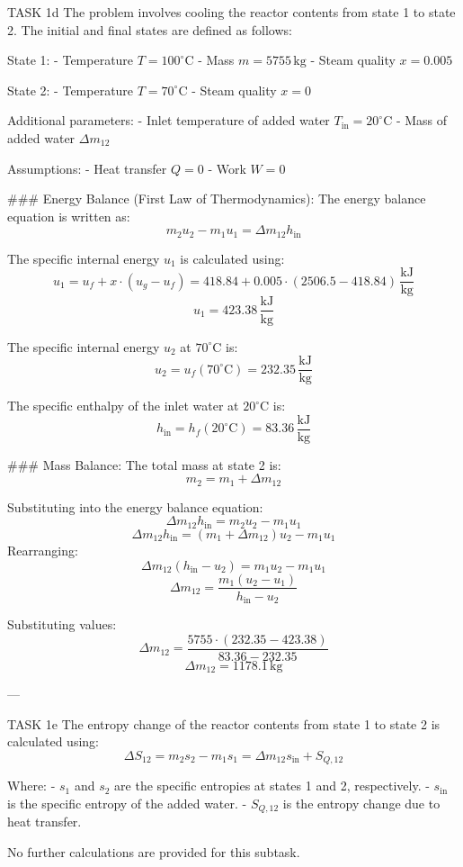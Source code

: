 TASK 1d  
The problem involves cooling the reactor contents from state 1 to state 2. The initial and final states are defined as follows:  

State 1:  
- Temperature \( T = 100^\circ\text{C} \)  
- Mass \( m = 5755 \, \text{kg} \)  
- Steam quality \( x = 0.005 \)  

State 2:  
- Temperature \( T = 70^\circ\text{C} \)  
- Steam quality \( x = 0 \)  

Additional parameters:  
- Inlet temperature of added water \( T_{\text{in}} = 20^\circ\text{C} \)  
- Mass of added water \( \Delta m_{12} \)  

Assumptions:  
- Heat transfer \( Q = 0 \)  
- Work \( W = 0 \)  

### Energy Balance (First Law of Thermodynamics):  
The energy balance equation is written as:  
\[
m_2 u_2 - m_1 u_1 = \Delta m_{12} h_{\text{in}}
\]  

The specific internal energy \( u_1 \) is calculated using:  
\[
u_1 = u_f + x \cdot (u_g - u_f) = 418.84 + 0.005 \cdot (2506.5 - 418.84) \, \frac{\text{kJ}}{\text{kg}}
\]  
\[
u_1 = 423.38 \, \frac{\text{kJ}}{\text{kg}}
\]  

The specific internal energy \( u_2 \) at \( 70^\circ\text{C} \) is:  
\[
u_2 = u_f(70^\circ\text{C}) = 232.35 \, \frac{\text{kJ}}{\text{kg}}
\]  

The specific enthalpy of the inlet water at \( 20^\circ\text{C} \) is:  
\[
h_{\text{in}} = h_f(20^\circ\text{C}) = 83.36 \, \frac{\text{kJ}}{\text{kg}}
\]  

### Mass Balance:  
The total mass at state 2 is:  
\[
m_2 = m_1 + \Delta m_{12}
\]  

Substituting into the energy balance equation:  
\[
\Delta m_{12} h_{\text{in}} = m_2 u_2 - m_1 u_1
\]  
\[
\Delta m_{12} h_{\text{in}} = (m_1 + \Delta m_{12}) u_2 - m_1 u_1
\]  
Rearranging:  
\[
\Delta m_{12} (h_{\text{in}} - u_2) = m_1 u_2 - m_1 u_1
\]  
\[
\Delta m_{12} = \frac{m_1 (u_2 - u_1)}{h_{\text{in}} - u_2}
\]  

Substituting values:  
\[
\Delta m_{12} = \frac{5755 \cdot (232.35 - 423.38)}{83.36 - 232.35}
\]  
\[
\Delta m_{12} = 1178.1 \, \text{kg}
\]  

---

TASK 1e  
The entropy change of the reactor contents from state 1 to state 2 is calculated using:  
\[
\Delta S_{12} = m_2 s_2 - m_1 s_1 = \Delta m_{12} s_{\text{in}} + S_{Q,12}
\]  

Where:  
- \( s_1 \) and \( s_2 \) are the specific entropies at states 1 and 2, respectively.  
- \( s_{\text{in}} \) is the specific entropy of the added water.  
- \( S_{Q,12} \) is the entropy change due to heat transfer.  

No further calculations are provided for this subtask.